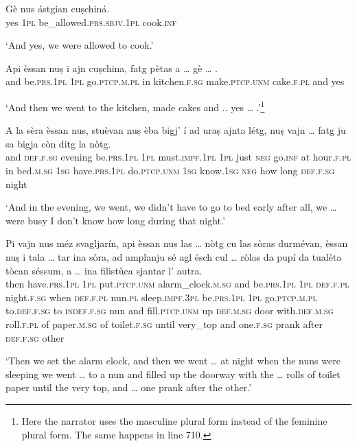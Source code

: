 \begin{linenumbers}
\gll    Gè nus\footnotemark{} ástgian cuṣchiná. \\
yes \textsc{1pl} be\_allowed.\textsc{prs.sbjv.1pl} cook.\textsc{inf}\\
\end{linenumbers}
\medskip
\glt `And yes, we were allowed to cook.'
\medskip

\begin{linenumbers}
\gll Api èssan nuṣ i\footnotemark{} ajn cuṣchina, fatg pètas a … gè … .\\
and be.\textsc{prs.1pl} \textsc{1pl} go.\textsc{ptcp.m.pl} in kitchen.\textsc{f.sg} make.\textsc{ptcp.unm} cake.\textsc{f.pl} and {} yes \\
\end{linenumbers}
\medskip
\glt `And then we went to the kitchen, made cakes and .. yes … .'\footnote{Here the narrator uses the masculine plural form instead of the feminine plural form. The same happens in line 710.}
\medskip

\begin{linenumbers}
\gll    A la sèra èssan nus, stuèvan nuṣ èba bigj’ í ad uraṣ ajnta létg, nuṣ vajn … fatg ju sa bigja còn  ditg la nòtg.\\
and \textsc{def.f.sg} evening be.\textsc{prs.1pl} \textsc{1pl} must.\textsc{impf.1pl} \textsc{1pl} just \textsc{neg} go.\textsc{inf} at hour.\textsc{f.pl} in  bed.\textsc{m.sg} \textsc{1sg} have.\textsc{prs.1pl} {} do.\textsc{ptcp.unm} \textsc{1sg} know.\textsc{1sg} \textsc{neg} how long \textsc{def.f.sg} night\\
\end{linenumbers}
\medskip
\glt `And in the evening, we went, we didn’t have to go to bed early after all, we … were busy I don’t know how long during that night.'
\medskip

\begin{linenumbers}
\gll Pi vajn nus méz svagljarín, api èssan nus las … nòtg cu las sòras durmévan, èssan nuṣ i\footnotemark{} tala … tar ina sòra, ad amplanju sé agl ésch cul … ròlas da pupí da tualèta tòcan séssum, a … ina filistùca sjantar l’ autra.\\
then have.\textsc{prs.1pl} \textsc{1pl} put.\textsc{ptcp.unm} alarm\_clock.\textsc{m.sg} and be.\textsc{prs.1pl} \textsc{1pl} \textsc{def.f.pl} {} night.\textsc{f.sg} when \textsc{def.f.pl} nun.\textsc{pl} sleep.\textsc{impf.3pl} be.\textsc{prs.1pl} \textsc{1pl} go.\textsc{ptcp.m.pl} to.\textsc{def.f.sg} {} to \textsc{indef.f.sg} nun and fill.\textsc{ptcp.unm} up \textsc{def.m.sg} door with.\textsc{def.m.sg} {} roll.\textsc{f.pl} of paper.\textsc{m.sg} of toilet.\textsc{f.sg} until very\_top and {} one.\textsc{f.sg} prank after \textsc{def.f.sg} other\\
\end{linenumbers}
\medskip
\glt `Then we set the alarm clock, and then we went … at night when the nuns were sleeping we went … to a nun and filled up the doorway with the … rolls of toilet paper until the very top, and … one prank after the other.'
\medskip

